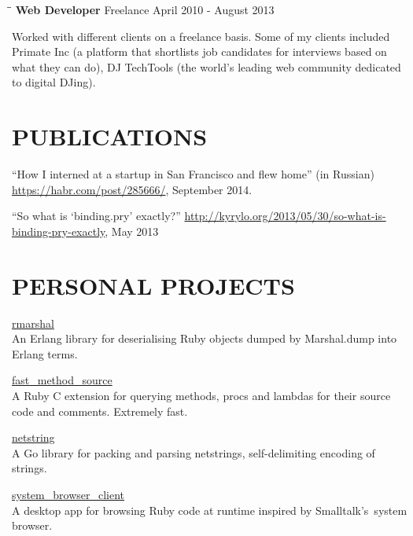 \documentclass{res}
\begin{document}
\begin{resume}
  \begin{tabbing}
    \hspace{2.3in}\= \hspace{2.6in}\= \kill
    {\bf Web Developer} \> Freelance \> \hspace{-0.5in} April 2010 - August 2013 \\
  \end{tabbing}\vspace{-20pt}
  Worked with different clients on a freelance basis. Some of my clients
  included Primate Inc (a platform that shortlists job candidates for interviews
  based on what they can do), DJ TechTools (the world's leading web community
  dedicated to digital DJing).

  \section{PUBLICATIONS}
  ``How I interned at a startup in San Francisco and flew home'' (in Russian)
  \href{https://habr.com/post/285666/}{https://habr.com/post/285666/},
  September 2014.

  ``So what is ‘binding.pry’ exactly?''
  \href{http://kyrylo.org/2013/05/30/so-what-is-binding-pry-exactly}
  {http://kyrylo.org/2013/05/30/so-what-is-binding-pry-exactly},
  May 2013

  \section{PERSONAL PROJECTS}

  \href{https://github.com/kyrylo/rmarshal}{rmarshal}
  \\
  An Erlang library for deserialising Ruby objects dumped by Marshal.dump into
  Erlang terms.

  \href{https://github.com/kyrylo/fast_method_source}{fast\_method\_source}
  \\
  A Ruby C extension for querying methods, procs and lambdas for their source
  code and comments. Extremely fast.

  \href{https://github.com/kyrylo/netstring}{netstring}
  \\
  A Go library for packing and parsing netstrings, self-delimiting encoding of
  strings.

  \href{https://github.com/kyrylo/system_browser_client}{system\_browser\_client}
  \\
  A desktop app for browsing Ruby code at runtime inspired by Smalltalk's system
  browser.


\end{resume}
\end{document}
